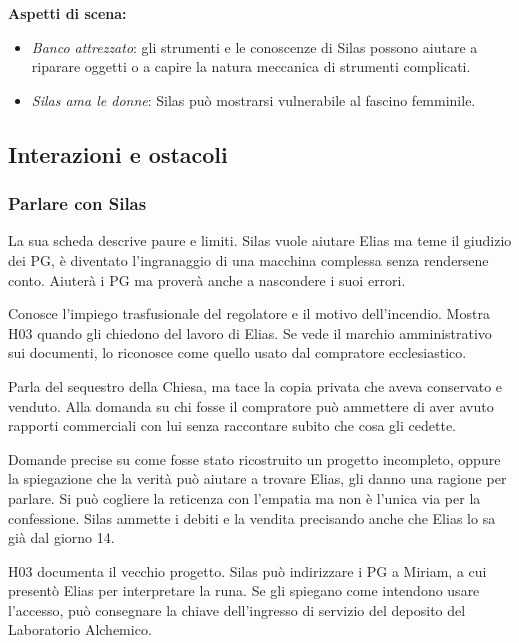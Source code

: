 \documentclass[11pt,a4paper]{article}
\newcommand{\aspect}[1]{\textit{\textcolor{blood}{#1}}}
\begin{document}
\textbf{Aspetti di scena:}
\begin{itemize}
\item \aspect{Banco attrezzato}: gli strumenti e le conoscenze di Silas possono aiutare a riparare oggetti o a capire la natura meccanica di strumenti complicati.
\item \aspect{Silas ama le donne}: Silas può mostrarsi vulnerabile al fascino femminile.
\end{itemize}

\subsection{Interazioni e ostacoli}
\subsubsection{Parlare con Silas}
La sua scheda descrive paure e limiti. Silas vuole aiutare Elias ma teme il giudizio dei PG, è diventato l'ingranaggio di una macchina complessa senza rendersene conto. Aiuterà i PG ma proverà anche a nascondere i suoi errori.

\begin{description}[leftmargin=5mm,style=nextline]
\item[Che cosa racconta senza resistenze.]
Conosce l'impiego trasfusionale del regolatore e il motivo dell'incendio. Mostra H03 quando gli chiedono del lavoro di Elias. Se vede il marchio amministrativo sui documenti, lo riconosce come quello usato dal compratore ecclesiastico.
\item[Che cosa omette inizialmente.]
Parla del sequestro della Chiesa, ma tace la copia privata che aveva conservato e venduto. Alla domanda su chi fosse il compratore può ammettere di aver avuto rapporti commerciali con lui senza raccontare subito che cosa gli cedette.
\item[Come può arrivare alla confessione.]
Domande precise su come fosse stato ricostruito un progetto incompleto, oppure la spiegazione che la verità può aiutare a trovare Elias, gli danno una ragione per parlare. Si può cogliere la reticenza con l'empatia ma non è l'unica via per la confessione. Silas ammette i debiti e la vendita precisando anche che Elias lo sa già dal giorno 14.
\item[Che cosa può offrire.]
H03 documenta il vecchio progetto. Silas può indirizzare i PG a Miriam, a cui presentò Elias per interpretare la runa. Se gli spiegano come intendono usare l'accesso, può consegnare la chiave dell'ingresso di servizio del deposito del Laboratorio Alchemico.
\end{description}
\end{document}
